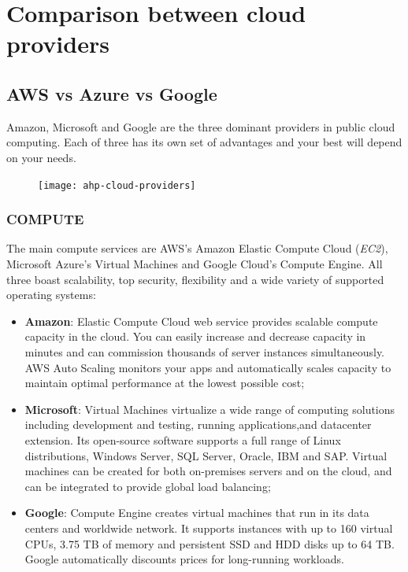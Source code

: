 \documentclass[11pt]{article} %
\begin{document}
\section{Comparison between cloud providers} 

\subsection{AWS vs Azure vs Google}
Amazon, Microsoft and Google are the three dominant providers in public cloud computing. Each of three has its own set of advantages and your best will depend on your needs. 
\begin{figure} [H]
	\centering
	\texttt{[image: ahp-cloud-providers]} \\
\end{figure}

\subsubsection{COMPUTE}
The main compute services are AWS’s Amazon Elastic Compute Cloud (\emph{EC2}), Microsoft Azure’s Virtual Machines and Google Cloud’s Compute Engine. All three boast scalability, top security, flexibility and a wide variety of supported operating systems:
\begin{itemize}
\item \textbf{Amazon}: Elastic Compute Cloud web service provides scalable compute capacity in the cloud. You can easily increase and decrease capacity in minutes and can commission thousands of server instances simultaneously. AWS Auto Scaling monitors your apps and automatically scales capacity to maintain optimal performance at the lowest possible cost;
\item \textbf{Microsoft}: Virtual Machines virtualize a wide range of computing solutions including development and testing, running applications,and datacenter extension. Its open-source software supports a full range of Linux distributions, Windows Server, SQL Server, Oracle, IBM and SAP. Virtual machines can be created for both on-premises servers and on the cloud, and can be integrated to provide global load balancing;
\item \textbf{Google}: Compute Engine creates virtual machines that run in its data centers and worldwide network. It supports instances with up to 160 virtual CPUs, 3.75 TB of memory and persistent SSD and HDD disks up to 64 TB. Google automatically discounts prices for long-running workloads.
\end{itemize}
\end{document}
